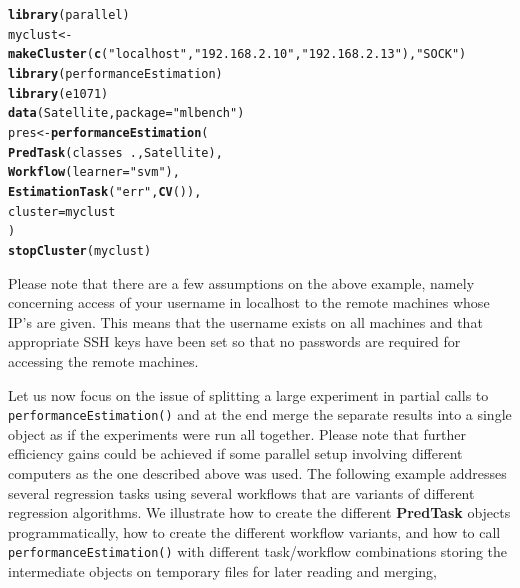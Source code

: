 \documentclass[10pt,a4paper]{article}\usepackage[]{graphicx}\usepackage[]{color}
\makeatletter
\newcommand{\hlstr}[1]{\textcolor[rgb]{0.192,0.494,0.8}{#1}}%
\newcommand{\hlopt}[1]{\textcolor[rgb]{0,0,0}{#1}}%
\newcommand{\hlstd}[1]{\textcolor[rgb]{0.345,0.345,0.345}{#1}}%
\newcommand{\hlkwb}[1]{\textcolor[rgb]{0.69,0.353,0.396}{#1}}%
\newcommand{\hlkwc}[1]{\textcolor[rgb]{0.333,0.667,0.333}{#1}}%
\newcommand{\hlkwd}[1]{\textcolor[rgb]{0.737,0.353,0.396}{\textbf{#1}}}%
\newenvironment{kframe}{%
 \def\at@end@of@kframe{}%
 \ifinner\ifhmode%
  \def\at@end@of@kframe{\end{minipage}}%
  \begin{minipage}{\columnwidth}%
 \fi\fi%
 \def\FrameCommand##1{\hskip\@totalleftmargin \hskip-\fboxsep
 \colorbox{shadecolor}{##1}\hskip-\fboxsep
     \hskip-\linewidth \hskip-\@totalleftmargin \hskip\columnwidth}%
 \MakeFramed {\advance\hsize-\width
   \@totalleftmargin\z@ \linewidth\hsize
   \@setminipage}}%
 {\par\unskip\endMakeFramed%
 \at@end@of@kframe}
\newenvironment{knitrout}{}{} %
\makeatother
\begin{document}
\begin{knitrout}\small
{}\color{fgcolor}\begin{kframe}
\begin{alltt}
\hlkwd{library}\hlstd{(parallel)}
\hlstd{myclust} \hlkwb{<-} \hlkwd{makeCluster}\hlstd{(}\hlkwd{c}\hlstd{(}\hlstr{"localhost"}\hlstd{,}\hlstr{"192.168.2.10"}\hlstd{,}\hlstr{"192.168.2.13"}\hlstd{),}\hlstr{"SOCK"}\hlstd{)}
\hlkwd{library}\hlstd{(performanceEstimation)}
\hlkwd{library}\hlstd{(e1071)}
\hlkwd{data}\hlstd{(Satellite,}\hlkwc{package}\hlstd{=}\hlstr{"mlbench"}\hlstd{)}
\hlstd{pres} \hlkwb{<-} \hlkwd{performanceEstimation}\hlstd{(}
    \hlkwd{PredTask}\hlstd{(classes} \hlopt{~} \hlstd{.,Satellite),}
    \hlkwd{Workflow}\hlstd{(}\hlkwc{learner}\hlstd{=}\hlstr{"svm"}\hlstd{),}
    \hlkwd{EstimationTask}\hlstd{(}\hlstr{"err"}\hlstd{,}\hlkwd{CV}\hlstd{()),}
    \hlkwc{cluster}\hlstd{=myclust}
    \hlstd{)}
\hlkwd{stopCluster}\hlstd{(myclust)}
\end{alltt}
\end{kframe}
\end{knitrout}

Please note that there are a few assumptions on the above example, namely concerning access of your username in localhost to the remote machines whose IP's are given. This means that the username exists on all machines and that appropriate SSH keys have been set so that no passwords are required for accessing the remote machines.

\vspace*{0.5cm}

Let us now focus on the issue of splitting a large experiment in partial calls to \texttt{performanceEstimation()} and at the end merge the separate results into a single object as if the experiments were run all together. Please note that further efficiency gains could be achieved if some parallel setup involving different computers as the one described above was used. The following example addresses several regression tasks using several workflows that are variants of different regression algorithms. We illustrate how to create the different \textbf{PredTask} objects programmatically,  how to create the different workflow variants, and how to call \texttt{performanceEstimation()} with different task/workflow combinations storing the intermediate objects on temporary files for later reading and merging,
\end{document}
